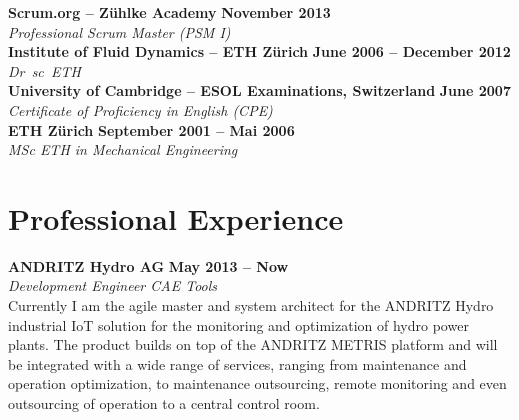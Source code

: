 \documentclass[line,11pt,a4paper]{resume}
\begin{document}
\begin{resume}
\textbf{Scrum.org -- Z\"uhlke Academy} \hfill \textbf{November 2013}%
\vspace{2mm}\\\vspace{1mm}%
\textsl{Professional Scrum Master (PSM I)}%
\vspace{2mm}\\\vspace{-1mm}%
%
\textbf{Institute of Fluid Dynamics -- ETH Z\"urich} \hfill \textbf{June 2006 -- December 2012}%
\vspace{2mm}\\\vspace{1mm}%
\textsl{Dr\ sc\ ETH}%
\vspace{2mm}\\\vspace{-1mm}%
%
\textbf{University of Cambridge -- ESOL Examinations, Switzerland} \hfill \textbf{June 2007}%
\vspace{2mm}\\\vspace{1mm}%
\textsl{Certificate of Proficiency in English (CPE)}%
\vspace{2mm}\\\vspace{-1mm}%
%
\textbf{ETH Z\"urich} \hfill \textbf{September 2001 -- Mai 2006}%
\vspace{2mm}\\\vspace{1mm}%
\textsl{MSc ETH in Mechanical Engineering}%
\vspace{-3mm}\\\vspace{-1mm}%

\section{\mysidestyle Professional Experience}\vspace{2mm}

\textbf{ANDRITZ Hydro AG} \hfill \textbf{May 2013 -- Now}
\vspace{2mm}\\\vspace{1mm}%
\textsl{Development Engineer CAE Tools}\\
Currently I am the agile master and system architect for the ANDRITZ
Hydro industrial IoT solution for the monitoring and optimization of hydro
power plants. The product builds on top of the ANDRITZ METRIS platform and will
be integrated with a wide range of services, ranging from maintenance and
operation optimization, to maintenance outsourcing, remote monitoring and even
outsourcing of operation to a central control room.


\end{resume}
\end{document}

